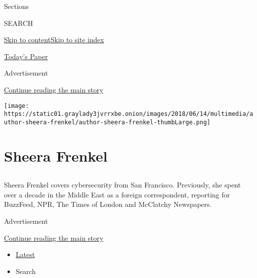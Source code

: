 Sections

SEARCH

\protect\hyperlink{site-content}{Skip to
content}\protect\hyperlink{site-index}{Skip to site index}

\href{https://myaccount.nytimes3xbfgragh.onion/auth/login?response_type=cookie\&client_id=vi}{}

\href{https://www.nytimes3xbfgragh.onion/section/todayspaper}{Today's
Paper}

Advertisement

\protect\hyperlink{after-top}{Continue reading the main story}

\texttt{[image: https://static01.graylady3jvrrxbe.onion/images/2018/06/14/multimedia/author-sheera-frenkel/author-sheera-frenkel-thumbLarge.png]}

\hypertarget{sheera-frenkel}{%
\section{Sheera Frenkel}\label{sheera-frenkel}}

\subsection{}

Sheera Frenkel covers cybersecurity from San Francisco. Previously, she
spent over a decade in the Middle East as a foreign correspondent,
reporting for BuzzFeed, NPR, The Times of London and McClatchy
Newspapers.

Advertisement

\protect\hyperlink{after-mid1}{Continue reading the main story}

\begin{itemize}
\tightlist
\item
  \protect\hyperlink{stream-panel}{Latest}
\item
  Search
\end{itemize}

